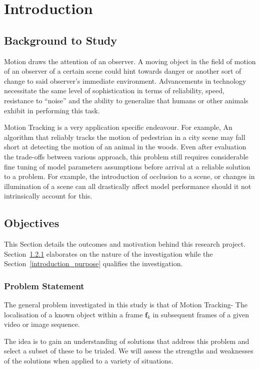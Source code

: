 \chapter{Introduction}\label{chapter_introduction}

\section{Background to Study}
Motion draws the attention of an observer. A moving object in the field of
motion of an observer of a certain scene could hint towards danger or another
sort of change to said observer's immediate environment. Advancements in
technology necessitate the same level of sophistication in terms of
reliability, speed, resistance to ``noise'' and the ability to generalize that
humans or other animals exhibit in performing this task.

Motion Tracking is a very application specific endeavour. For example, An
algorithm that reliably tracks the motion of pedestrian in a city scene may fall
short at detecting the motion of an animal in the woods. Even after evaluation
the trade-offs between various approach, this problem still requires
considerable fine tuning of model parameters assumptions before arrival at a
reliable solution to a problem.  For example, the introduction of occlusion to a
scene, or changes in illumination of a scene can all drastically affect model
performance should it not intrinsically account for this.

\section{Objectives}\label{introduction_objectives}
This Section details the outcomes and motivation behind this research project.
Section~\ref{introduction_problem} elaborates on the nature of the investigation
while the Section~\ref{introduction_purpose} qualifies the investigation.

\subsection{Problem Statement}\label{introduction_problem}
The general problem investigated in this study is that of Motion Tracking- The
localisation of a known object within a frame $\mathbf{f}_k$ in subsequent
frames of a given video or image sequence.  

The idea is to gain an understanding of solutions that address this problem and
select a subset of these to be trialed. We will assess the strengths and
weaknesses of the solutions when applied to a variety of situations.


